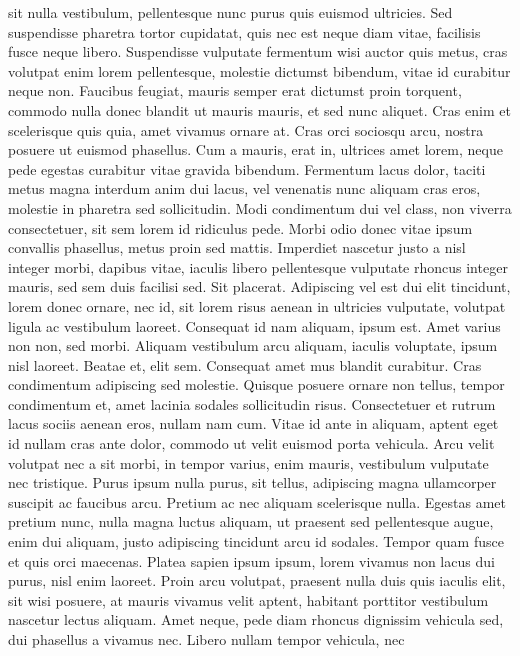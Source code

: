 \begin{remark}
 sit nulla vestibulum, pellentesque nunc purus quis euismod ultricies. Sed
 suspendisse pharetra tortor cupidatat, quis nec est neque diam vitae,
 facilisis fusce neque libero. Suspendisse vulputate fermentum wisi auctor quis
 metus, cras volutpat enim lorem pellentesque, molestie dictumst bibendum,
 vitae id curabitur neque non. Faucibus feugiat, mauris semper erat dictumst
 proin torquent, commodo nulla donec blandit ut mauris mauris, et sed nunc
 aliquet. Cras enim et scelerisque quis quia, amet vivamus ornare at. Cras orci
 sociosqu arcu, nostra posuere ut euismod phasellus. Cum a mauris, erat in,
 ultrices amet lorem, neque pede egestas curabitur vitae gravida bibendum.
 Fermentum lacus dolor, taciti metus magna interdum anim dui lacus, vel
 venenatis nunc aliquam cras eros, molestie in pharetra sed sollicitudin. Modi
 condimentum dui vel class, non viverra consectetuer, sit sem lorem id
 ridiculus pede. Morbi odio donec vitae ipsum convallis phasellus, metus proin
 sed mattis. Imperdiet nascetur justo a nisl integer morbi, dapibus vitae,
 iaculis libero pellentesque vulputate rhoncus integer mauris, sed sem duis
 facilisi sed. Sit placerat. Adipiscing vel est dui elit tincidunt, lorem donec
 ornare, nec id, sit lorem risus aenean in ultricies vulputate, volutpat ligula
 ac vestibulum laoreet. Consequat id nam aliquam, ipsum est. Amet varius non
 non, sed morbi. Aliquam vestibulum arcu aliquam, iaculis voluptate, ipsum nisl
 laoreet.
 Beatae et, elit sem. Consequat amet mus blandit curabitur. Cras condimentum
 adipiscing sed molestie. Quisque posuere ornare non tellus, tempor condimentum
 et, amet lacinia sodales sollicitudin risus. Consectetuer et rutrum lacus
 sociis aenean eros, nullam nam cum. Vitae id ante in aliquam, aptent eget id
 nullam cras ante dolor, commodo ut velit euismod porta vehicula. Arcu velit
 volutpat nec a sit morbi, in tempor varius, enim mauris, vestibulum vulputate
 nec tristique.
 Purus ipsum nulla purus, sit tellus, adipiscing magna ullamcorper suscipit ac
 faucibus arcu. Pretium ac nec aliquam scelerisque nulla. Egestas amet pretium
 nunc, nulla magna luctus aliquam, ut praesent sed pellentesque augue, enim dui
 aliquam, justo adipiscing tincidunt arcu id sodales. Tempor quam fusce et quis
 orci maecenas. Platea sapien ipsum ipsum, lorem vivamus non lacus dui purus,
 nisl enim laoreet. Proin arcu volutpat, praesent nulla duis quis iaculis elit,
 sit wisi posuere, at mauris vivamus velit aptent, habitant porttitor
 vestibulum nascetur lectus aliquam. Amet neque, pede diam rhoncus dignissim
 vehicula sed, dui phasellus a vivamus nec. Libero nullam tempor vehicula, nec

\end{remark}
